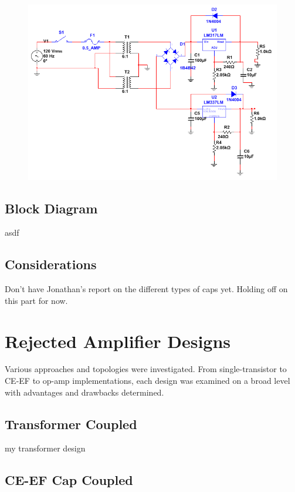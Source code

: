 \documentclass[journal]{IEEEtran}
\begin{document}
\begin{figure}[H]
\centering
\includegraphics[scale=.4]{final-psu.png}
\label{fig_psu_schem}
\end{figure}

\subsection{Block Diagram}

asdf

\subsection{Considerations}

Don't have Jonathan's report on the different types of caps yet. Holding off on this part for now.

\section{Rejected Amplifier Designs}

Various approaches and topologies were investigated. From single-transistor to CE-EF to op-amp implementations, each design was examined on a broad level with advantages and drawbacks determined.

\subsection{Transformer Coupled}

my transformer design

\subsection{CE-EF Cap Coupled}
\end{document}
